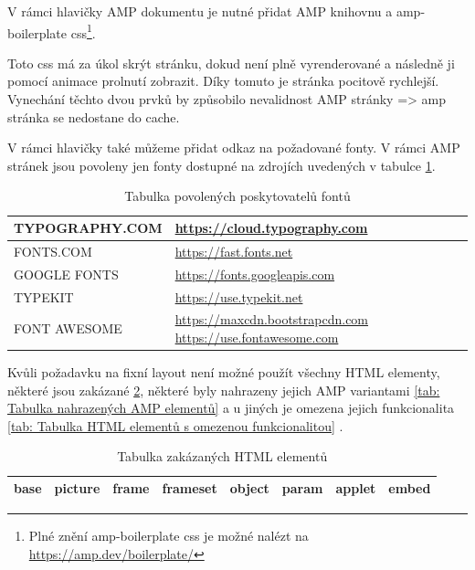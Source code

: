 V rámci hlavičky AMP dokumentu je nutné přidat AMP knihovnu a amp-boilerplate css\footnote{Plné znění amp-boilerplate css je možné nalézt na \url{https://amp.dev/boilerplate/}}\cite{AMPBoilerplate}.

Toto css má za úkol skrýt stránku, dokud není plně vyrenderované a následně ji pomocí animace prolnutí zobrazit. Díky tomuto je stránka pocitově rychlejší.
Vynechání těchto dvou prvků by způsobilo nevalidnost AMP stránky => amp stránka se nedostane do cache.

V rámci hlavičky také můžeme přidat odkaz na požadované fonty. V rámci AMP stránek jsou povoleny jen fonty dostupné na zdrojích uvedených v tabulce \ref{tab:Tabulka povolených zdrojů fontů}\cite{ampCustomFonts}.

\begin{table}[H]
	\caption{Tabulka povolených poskytovatelů fontů}
	\centering
	\begin{tabular}{m{10em} | m{20em}}
		\toprule
		\cmidrule(r){1-2}
		TYPOGRAPHY.COM & \url{https://cloud.typography.com} \\ \midrule
		FONTS.COM & \url{https://fast.fonts.net} \\ \midrule
		GOOGLE FONTS & \url{https://fonts.googleapis.com} \\ \midrule
		TYPEKIT & \url{https://use.typekit.net} \\ \midrule
		FONT AWESOME & \url{https://maxcdn.bootstrapcdn.com} \newline \url{https://use.fontawesome.com} \\
		\bottomrule
	\end{tabular}
	\label{tab:Tabulka povolených zdrojů fontů}
\end{table}

Kvůli požadavku na fixní layout není možné použít všechny HTML elementy, některé jsou zakázané \ref{tab: Tabulka zakázaných HTML elementů}, některé byly nahrazeny jejich AMP variantami \ref{tab: Tabulka nahrazených AMP elementů} a u jiných je omezena jejich funkcionalita \ref{tab: Tabulka HTML elementů s omezenou funkcionalitou} \cite[p.\ 41]{AMP-ENG-Book}.

\begin{table}[H]
	\caption{Tabulka zakázaných HTML elementů} 
	\centering
	\begin{tabular}{c|c|c|c|c|c|c|c}
		\toprule
		base & picture & frame & frameset & object & param & applet & embed \\
		\bottomrule
	\end{tabular}
	\label{tab: Tabulka zakázaných HTML elementů}
\end{table}

